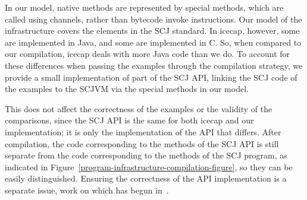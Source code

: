 In our model, native methods are represented by special methods, which
are called using channels, rather than bytecode invoke instructions.
Our model of the infrastructure covers the elements in the SCJ
standard. 
In icecap, however, some are implemented in Java, and some are
implemented in C. 
So, when compared to our compilation, icecap deals with more Java code
than we do. 
To account for these differences when passing the examples through the
compilation strategy, we provide a small implementation of part of the
SCJ API, linking the SCJ code of the examples to the SCJVM via the
special methods in our model.

This does not affect the correctness of the examples or the validity
of the comparisons, since the SCJ API is the same for both icecap and
our implementation; it is only the implementation of the API that
differs.
After compilation, the code corresponding to the methods of the SCJ
API is still separate from the code corresponding to the methods of the SCJ
program, as indicated in
Figure~\ref{program-infrastructure-compilation-figure}, so they can be
easily distinguished.
Ensuring the correctness of the API implementation is a separate
issue, work on which has begun in~\cite{freitas2016}.


